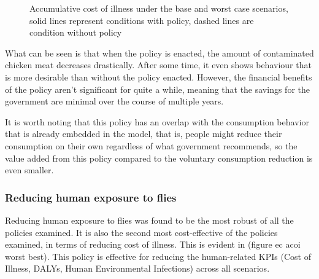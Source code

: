 \begin{figure}[h!]
\begin{minipage}{0.45\textwidth}
        \caption{Accumulative cost of illness under the base and worst case scenarios, solid lines represent conditions with policy, dashed lines are condition without policy}
        \label{fig:pc_bwc_acoi}
    \end{minipage}
\end{figure}

What can be seen is that when the policy is enacted, the amount of contaminated chicken meat decreases drastically. After some time, it even shows behaviour that is more desirable than without the policy enacted. However, the financial benefits of the policy aren't significant for quite a while, meaning that the savings for the government are minimal over the course of multiple years.

It is worth noting that this policy has an overlap with the consumption behavior that is already embedded in the model, that is, people might reduce their consumption on their own regardless of what government recommends, so the value added from this policy compared to the voluntary consumption reduction is even smaller.

\subsubsection{Reducing human exposure to flies}
\label{reducing human exposure to flies}
Reducing human exposure to flies was found to be the most robust of all the policies examined. It is also the second most cost-effective of the policies examined, in terms of reducing cost of illness. This is evident in (figure ec acoi worst best). This policy is effective for reducing the human-related KPIs (Cost of Illness, DALYs, Human Environmental Infections) across all scenarios. 

